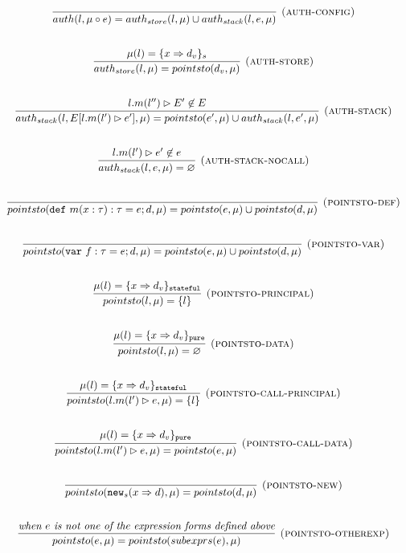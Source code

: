 \documentclass{llncs}
\newcommand{\keywadj}[1]{\mathtt{#1}}
\newcommand{\keyw}[1]{\keywadj{#1}~}
\begin{document}
\[
\begin{array}{c}
\infer[\textsc{(auth-config)}]
  {auth(l,\mu \circ e) = auth_{store}(l,\mu) \cup auth_{stack}(l,e,\mu)}
  {}\\[5ex]

\infer[\textsc{(auth-store)}]
  {auth_{store}(l,\mu) = pointsto(d_v,\mu)}
  {\mu(l) = \{ x \Rightarrow d_v \}_{s}}\\[5ex]
  
\infer[\textsc{(auth-stack)}]
  {auth_{stack}(l,E[l.m(l') \rhd e'],\mu) = pointsto(e',\mu) \cup auth_{stack}(l,e',\mu)}
  {l.m(l'') \rhd E' \not\in E}\\[5ex]
  
\infer[\textsc{(auth-stack-nocall)}]
  {auth_{stack}(l,e,\mu) = \varnothing}
  {l.m(l') \rhd e' \not\in e}\\[5ex]
  
\infer[\textsc{(pointsto-def)}]
  {pointsto(\keyw{def} m(x:\tau):\tau = e; d,\mu) = pointsto(e,\mu) \cup pointsto(d,\mu)}
  {}\\[5ex]
  
\infer[\textsc{(pointsto-var)}]
  {pointsto(\keyw{var} f:\tau = e; d,\mu) = pointsto(e,\mu) \cup pointsto(d,\mu)}
  {}\\[5ex]
  
\infer[\textsc{(pointsto-principal)}]
  {pointsto(l,\mu) = \{ l \}}
  {\mu(l) = \{ x \Rightarrow d_v \}_\keywadj{stateful}}\\[5ex]
  
\infer[\textsc{(pointsto-data)}]
  {pointsto(l,\mu) = \varnothing }
  {\mu(l) = \{ x \Rightarrow d_v \}_\keywadj{pure}}\\[5ex]

\infer[\textsc{(pointsto-call-principal)}]
  {pointsto(l.m(l') \rhd e,\mu) = \{l\} }
  {\mu(l) = \{ x \Rightarrow d_v \}_\keywadj{stateful}}\\[5ex]
  
\infer[\textsc{(pointsto-call-data)}]
  {pointsto(l.m(l') \rhd e,\mu) = pointsto(e,\mu)}
  {\mu(l) = \{ x \Rightarrow d_v \}_\keywadj{pure}}\\[5ex]
  
\infer[\textsc{(pointsto-new)}]
  {pointsto(\keywadj{new}_{s}(x \Rightarrow d),\mu) = pointsto(d,\mu) }
  {}\\[5ex]
  
\infer[\textsc{(pointsto-otherexp)}]
  {pointsto(e,\mu) = pointsto(subexprs(e),\mu) }
  {\textit{when $e$ is not one of the expression forms defined above}}\\[5ex]

\end{array}
\]
\end{document}

